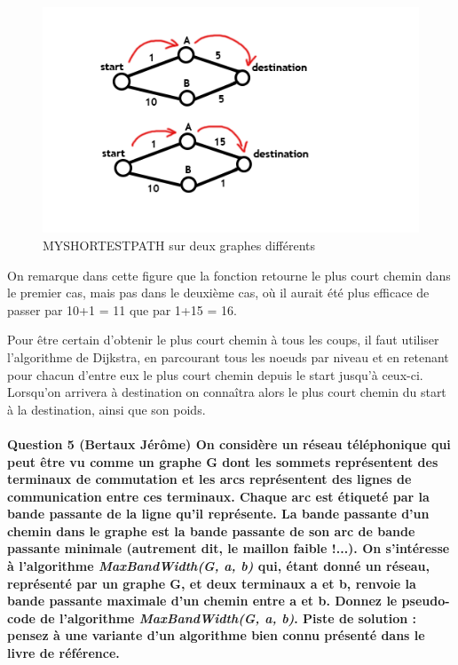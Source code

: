 \documentclass[a4paper]{article}
\begin{document}
\begin{figure}[H]
\centering
\includegraphics[scale=0.5]{graphs}
\caption{MYSHORTESTPATH sur deux graphes différents}
\end{figure} 

On remarque dans cette figure que la fonction retourne le plus court chemin dans le premier cas, mais pas dans le deuxième cas, où il aurait été plus efficace de passer par 10+1 = 11 que par 1+15 = 16. 

Pour être certain d'obtenir le plus court chemin à tous les coups, il faut utiliser l'algorithme de Dijkstra, en parcourant tous les noeuds par niveau et en retenant pour chacun d'entre eux le plus court chemin depuis le start jusqu'à ceux-ci. Lorsqu'on arrivera à destination on connaîtra alors le plus court chemin du start à la destination, ainsi que son poids.
\paragraph{Question 5 (Bertaux Jérôme) On considère un réseau téléphonique qui peut être vu comme un graphe G dont les sommets représentent des terminaux de commutation et les arcs représentent des lignes de communication entre ces terminaux. Chaque arc est étiqueté par la bande passante de la ligne qu’il représente. La bande passante d’un chemin dans le graphe est la bande passante de son arc de bande passante minimale (autrement dit, le maillon faible !...). On s'intéresse à l’algorithme \textit{MaxBandWidth(G, a, b)} qui, étant donné un réseau, représenté par un graphe G, et deux terminaux a et b, renvoie la bande passante maximale d’un chemin entre a et b. Donnez le pseudo- code de l’algorithme \textit{MaxBandWidth(G, a, b)}. Piste de solution : pensez à une variante d’un algorithme bien connu présenté dans le livre de référence.}
\end{document}
